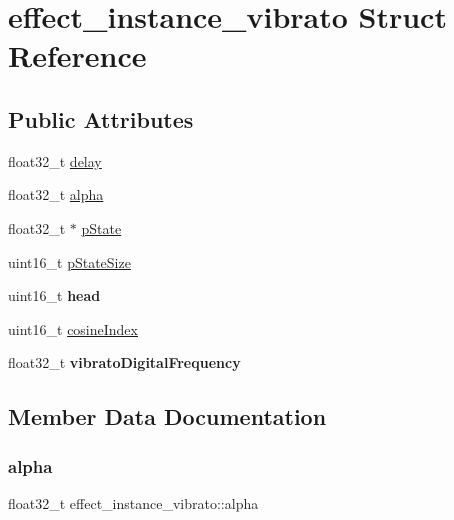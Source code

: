 \hypertarget{structeffect__instance__vibrato}{}\section{effect\+\_\+instance\+\_\+vibrato Struct Reference}
\label{structeffect__instance__vibrato}
\subsection*{Public Attributes}
\begin{DoxyCompactItemize}
\item 
float32\+\_\+t \mbox{\hyperlink{structeffect__instance__vibrato_ae8d6f160f175cf7cb84f78916d5d84f1}{delay}}
\item 
float32\+\_\+t \mbox{\hyperlink{structeffect__instance__vibrato_aa94788a7cfd636b2d023ca907b509003}{alpha}}
\item 
float32\+\_\+t $\ast$ \mbox{\hyperlink{structeffect__instance__vibrato_aade1993dc3977af5be5cb201dd8c8ffd}{p\+State}}
\item 
uint16\+\_\+t \mbox{\hyperlink{structeffect__instance__vibrato_a695eb376033e80b3a5876940f81a4b86}{p\+State\+Size}}
\item 
\mbox{\label{structeffect__instance__vibrato_ac211028c7fde55130286cec3c55ccf72}} 
uint16\+\_\+t {\bfseries head}
\item 
uint16\+\_\+t \mbox{\hyperlink{structeffect__instance__vibrato_a953a90099805fc2106b970a3c0ee334b}{cosine\+Index}}
\item 
\mbox{\label{structeffect__instance__vibrato_a2267f007161c6c55c3f20c11534ba968}} 
float32\+\_\+t {\bfseries vibrato\+Digital\+Frequency}
\end{DoxyCompactItemize}


\subsection{Member Data Documentation}
\mbox{\label{structeffect__instance__vibrato_aa94788a7cfd636b2d023ca907b509003}} 
\subsubsection{\texorpdfstring{alpha}{alpha}}
{\footnotesize\ttfamily float32\+\_\+t effect\+\_\+instance\+\_\+vibrato\+::alpha}

